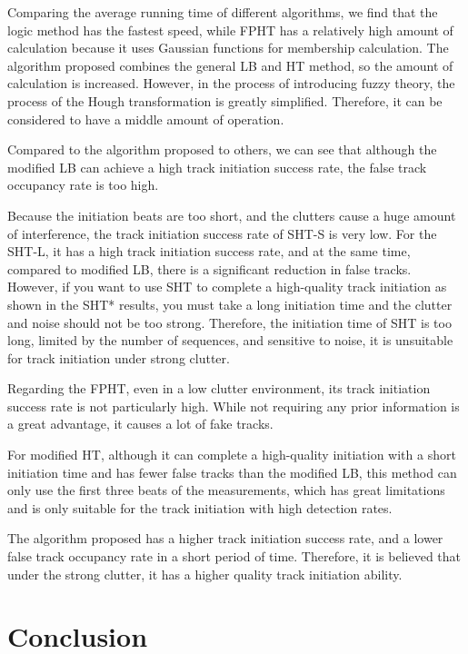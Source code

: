 \documentclass[default,iicol]{sn-jnl}%
\theoremstyle{thmstyleone}%
\theoremstyle{thmstyletwo}%
\theoremstyle{thmstylethree}%
\begin{document}
Comparing the average running time of different algorithms, we find that the logic method has the fastest speed, while FPHT has a relatively high amount of calculation because it uses Gaussian functions for membership calculation. The algorithm proposed combines the general LB and HT method, so the amount of calculation is increased. However, in the process of introducing fuzzy theory, the process of the Hough transformation is greatly simplified. Therefore, it can be considered to have a middle amount of operation.

Compared to the algorithm proposed to others, we can see that although the modified LB can achieve a high track initiation success rate, the false track occupancy rate is too high.

Because the initiation beats are too short, and the clutters cause a huge amount of interference, the track initiation success rate of SHT-S is very low. For the SHT-L, it has a high track initiation success rate, and at the same time, compared to modified LB, there is a significant reduction in false tracks. However, if you want to use SHT to complete a high-quality track initiation as shown in the SHT* results, you must take a long initiation time and the clutter and noise should not be too strong. Therefore, the initiation time of SHT is too long, limited by the number of sequences, and sensitive to noise, it is unsuitable for track initiation under strong clutter.

Regarding the FPHT, even in a low clutter environment, its track initiation success rate is not particularly high. While not requiring any prior information is a great advantage, it causes a lot of fake tracks.

For modified HT, although it can complete a high-quality initiation with a short initiation time and has fewer false tracks than the modified LB, this method can only use the first three beats of the measurements, which has great limitations and is only suitable for the track initiation with high detection rates.

The algorithm proposed has a higher track initiation success rate, and a lower false track occupancy rate in a short period of time. Therefore, it is believed that under the strong clutter, it has a higher quality track initiation ability.

\section{Conclusion}\label{sec4}
\end{document}
